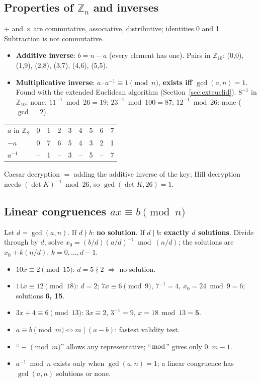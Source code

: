 \subsection{Properties of $\mathbb{Z}_n$ and inverses}
$+$ and $\times$ are commutative, associative, distributive; identities 0 and 1. Subtraction is not commutative.
\begin{itemize}
  \item \textbf{Additive inverse}: $b = n - a$ (every element has one). Pairs in $\mathbb{Z}_{10}$: (0,0), (1,9), (2,8), (3,7), (4,6), (5,5).
  \item \textbf{Multiplicative inverse}: $a \cdot a^{-1} \equiv 1 \pmod n$, \textbf{exists iff $\gcd(a, n) = 1$}. Found with the extended Euclidean algorithm (Section~\ref{sec:exteuclid}). $8^{-1}$ in $\mathbb{Z}_{10}$: none. $11^{-1} \bmod 26 = 19$; $23^{-1} \bmod 100 = 87$; $12^{-1} \bmod 26$: none ($\gcd = 2$).
\end{itemize}
\begin{center}\small\setlength{\tabcolsep}{6pt}
\begin{tabular}{@{}l*{8}{c}@{}}
\toprule
$a$ in $\mathbb{Z}_8$ & 0&1&2&3&4&5&6&7\\
$-a$ & 0&7&6&5&4&3&2&1\\
$a^{-1}$ & --&1&--&3&--&5&--&7\\
\bottomrule
\end{tabular}
\end{center}
Caesar decryption $=$ adding the additive inverse of the key; Hill decryption needs $(\det K)^{-1} \bmod 26$, so $\gcd(\det K, 26) = 1$.

\subsection{Linear congruences $ax \equiv b \pmod n$}
Let $d = \gcd(a, n)$. If $d \nmid b$: \textbf{no solution}. If $d \mid b$: \textbf{exactly $d$ solutions}. Divide through by $d$, solve $x_0 = (b/d)(a/d)^{-1} \bmod (n/d)$; the solutions are $x_0 + k(n/d)$, $k = 0, \dots, d-1$.
\begin{itemize}
  \item $10x \equiv 2 \pmod{15}$: $d = 5 \nmid 2$ $\Rightarrow$ no solution.
  \item $14x \equiv 12 \pmod{18}$: $d = 2$; $7x \equiv 6 \pmod 9$, $7^{-1} = 4$, $x_0 = 24 \bmod 9 = 6$; solutions \textbf{6, 15}.
  \item $3x + 4 \equiv 6 \pmod{13}$: $3x \equiv 2$, $3^{-1} = 9$, $x = 18 \bmod 13 = \mathbf{5}$.
\end{itemize}

\begin{examtip}
\begin{itemize}
  \item $a \equiv b \pmod m \iff m \mid (a - b)$: fastest validity test.
  \item ``$\equiv \pmod m$'' allows any representative; ``$\bmod$'' gives only $0..m-1$.
  \item $a^{-1} \bmod n$ exists only when $\gcd(a, n) = 1$; a linear congruence has $\gcd(a,n)$ solutions or none.
\end{itemize}
\end{examtip}
